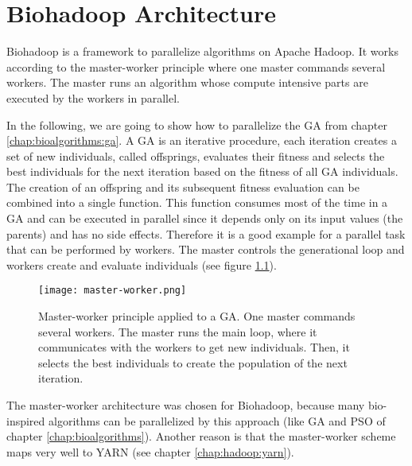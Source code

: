 \chapter{Biohadoop Architecture}
\label{chap:impl}

Biohadoop is a framework to parallelize algorithms on Apache Hadoop. It works according to the master-worker principle where one master commands several workers. The master runs an algorithm whose compute intensive parts are executed by the workers in parallel.

In the following, we are going to show how to parallelize the GA from chapter \ref{chap:bioalgorithms:ga}. A GA is an iterative procedure, each iteration creates a set of new individuals, called offsprings, evaluates their fitness and selects the best individuals for the next iteration based on the fitness of all GA individuals. The creation of an offspring and its subsequent fitness evaluation can be combined into a single function. This function consumes most of the time in a GA and can be executed in parallel since it depends only on its input values (the parents) and has no side effects. Therefore it is a good example for a parallel task that can be performed by workers. The master controls the generational loop and workers create and evaluate individuals (see figure \ref{fig:master-worker}).


\begin{figure}
  \centering
  \texttt{[image: master-worker.png]}
  \caption[Master-worker principle applied to GA]{Master-worker principle applied to a GA. One master commands several workers. The master runs the main loop, where it communicates with the workers to get new individuals. Then, it selects the best individuals to create the population of the next iteration.}
  \label{fig:master-worker}
\end{figure}

The master-worker architecture was chosen for Biohadoop, because many bio-inspired algorithms can be parallelized by this approach (like GA and PSO of chapter \ref{chap:bioalgorithms}). Another reason is that the master-worker scheme maps very well to YARN (see chapter \ref{chap:hadoop:yarn}).

